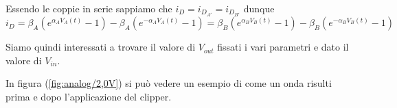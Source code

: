 		Essendo le coppie in serie sappiamo che $i_{D} = i_{D_{A'}} = i_{D_{B'}}$ dunque
		\[
			i_{D} = \beta_{A}\left(e^{\alpha_{A}V_{A}(t)}-1\right)-\beta_{A}\left(e^{-\alpha_{A}V_{A}(t)}-1\right) = \beta_{B}\left(e^{\alpha_{B}V_{B}(t)}-1\right)-\beta_{B}\left(e^{-\alpha_{B}V_{B}(t)}-1\right)
		\]
		
		Siamo quindi interessati a trovare il valore di $V_{out}$ fissati i vari parametri e dato il valore di $V_{in}$.
		
		\vspace{30px}
		In figura (\ref{fig:analog/2,0V}) si può vedere un esempio di come un onda risulti prima e dopo l'applicazione del clipper.
		
